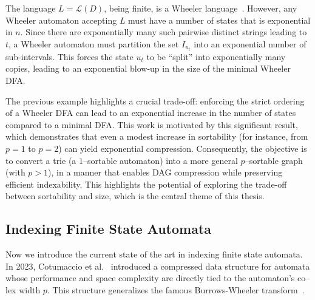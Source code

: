 \begin{example}
    The language $L = \mathcal{L}(D)$, being finite, is a Wheeler language~\cite{alanko2021wheeler}. However, any Wheeler automaton accepting $L$ must have a number of states that is exponential in $n$. Since there are exponentially many such pairwise distinct strings leading to $t$, a Wheeler automaton must partition the set $I_{u_t}$ into an exponential number of sub-intervals. This forces the state $u_t$ to be ``split'' into exponentially many copies, leading to an exponential blow-up in the size of the minimal Wheeler DFA.
\end{example}

The previous example highlights a crucial trade-off: enforcing the strict ordering of a Wheeler DFA can lead to an exponential increase in the number of states compared to a minimal DFA. 
This work is motivated by this significant result, which demonstrates that even a modest increase in sortability (for instance, from $p=1$ to $p=2$) can yield exponential compression. Consequently, the objective is to convert a trie (a $1$--sortable automaton) into a more general $p$--sortable graph (with $p>1$), in a manner that enables DAG compression while preserving efficient indexability.
This highlights the potential of exploring the trade-off between sortability and size, which is the central theme of this thesis.

\begin{comment}
\cref{thm:exp_increase} formalizes this observation, showing that the size of a minimal Wheeler DFA cannot be bounded by a polynomial in the size of the minimal DFA.
\begin{theorem}[\cite{manziniRationalConstructionWheeler2024}, Theorem 29] \label{thm:exp_increase}
    Let $L = \mathcal{L}(D) = \mathcal{L}(D^w)$, where $L$ is Wheeler, $D$ is minimal, $D^w$ is minimal Wheeler, and let $f(\cdot,\cdot)$ be such that \\
    $|D^w| = \mathcal{O}(f(|D|,width(D)))$. Then, for any $k,p \in \mathbb{N}$, $f(n,p) \notin \mathcal{O}(n^k + 2^p)$.
\end{theorem}
\end{comment}

\subsection{Indexing Finite State Automata} \label{sec:indexing}
Now we introduce the current state of the art in indexing finite state automata. In 2023, Cotumaccio et al.~\cite{cotumaccio2021indexing} introduced a compressed data structure for automata whose performance and space complexity are directly tied to the automaton's co--lex width $p$. This structure generalizes the famous Burrows-Wheeler transform~\cite{burrows1994block}. 

